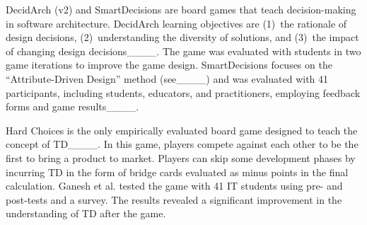         
        DecidArch (v2) and SmartDecisions are board games that teach decision-making in software architecture.
        DecidArch learning objectives are (1)~the rationale of design decisions, (2)~understanding the diversity of solutions, and (3)~the impact of changing design decisions____. 
        The game was evaluated with students in two game iterations to improve the game design.
        SmartDecisions focuses on the ``Attribute-Driven Design'' method (see____) and was evaluated with 41 participants, including students, educators, and practitioners, employing feedback forms and game results____.
        
        Hard Choices is the only empirically evaluated board game designed to teach the concept of TD____. %
        In this game, players compete against each other to be the first to bring a product to market. %
        Players can skip some development phases by incurring TD in the form of bridge cards evaluated as minus points in the final calculation. 
        Ganesh et al. tested the game with 41 IT students using pre- and post-tests and a survey. 
        The results revealed a significant improvement in the understanding of TD after the game. 

